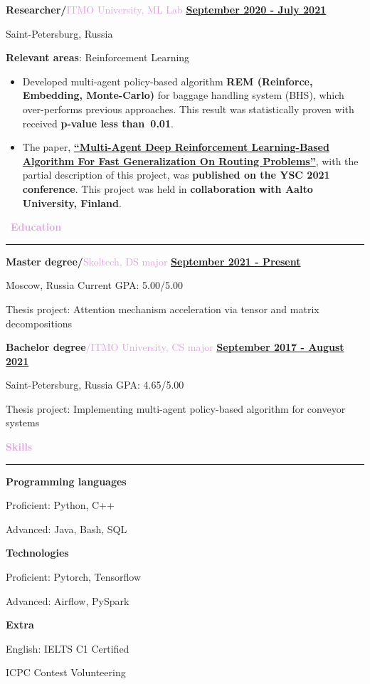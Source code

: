 \documentclass[10pt,a4paper]{report}
\begin{document}
\textbf{\large{Researcher/}}\textcolor{Plum}{ITMO University, ML Lab}
\hfill
\textbf {\underline{September 2020 - July 2021}}

Saint-Petersburg, Russia

\textbf{Relevant areas}: Reinforcement Learning

\begin{itemize}[label={}, left=10pt]
    \item Developed multi-agent policy-based algorithm \textbf{REM (Reinforce, Embedding, Monte-Carlo)} for baggage handling system (BHS), which over-performs previous approaches. This result was statistically proven with received \textbf{p-value less than~0.01}.
    
    \item The paper, \textbf{\href{https://aaltodoc.aalto.fi/handle/123456789/111642}{\enquote{Multi-Agent Deep Reinforcement Learning-Based Algorithm For Fast Generalization On Routing Problems}}},
    with the partial description of this project, was \textbf{published on the YSC 2021 conference}. This project was held in \textbf{collaboration with Aalto University, Finland}.
    
\end{itemize}

\par\hbox{
\Large{\textcolor{Plum}{\textbf{Education}}}
}{\kern5pt\hrule\kern5pt}

\textbf{\large{Master degree/}}\textcolor{Plum}{Skoltech, DS major}
\hfill
\textbf{\underline{September 2021 - Present}}

Moscow, Russia \hfill Current GPA: 5.00/5.00

\hspace{6mm}
Thesis project: Attention mechanism acceleration via tensor and matrix decompositions

\vspace{3mm}

\textbf{\large{Bachelor degree}}\textcolor{Plum}{/ITMO University, CS major}
\hfill
\textbf{\underline{September 2017 - August 2021}}

Saint-Petersburg, Russia \hfill GPA: 4.65/5.00

\hspace{6mm}
Thesis project: Implementing multi-agent policy-based algorithm for conveyor systems

\vspace{3mm}
\par\hbox{\Large{\textcolor{Plum}{\textbf{Skills}}}}\kern5pt\hrule
\begin{multicols}{3}

\textbf{\large{Programming languages}}

Proficient: Python, C++

Advanced: Java, Bash, SQL

\textbf{\large{Technologies}}

Proficient: Pytorch, Tensorflow

Advanced: Airflow, PySpark

\textbf{\large{Extra}}

English: IELTS C1 Certified

ICPC Contest Volunteering

\end{multicols}
\end{document}
